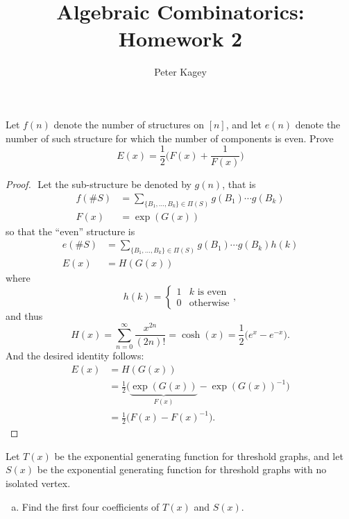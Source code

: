 \documentclass{article}
\newenvironment{problem}[2][Problem]{\begin{trivlist}
\item[\hskip \labelsep {\bfseries #1}\hskip \labelsep {\bfseries #2.}]}{\end{trivlist}}
\newcommand{\set}[1]{\{ #1 \}}
\newcommand{\paren}[1]{\biggl( #1 \biggr)}
\begin{document}
\title{Algebraic Combinatorics: Homework 2}
\author{Peter Kagey}

\maketitle

\begin{problem}{1}
  Let $f(n)$ denote the number of structures on $[n]$, and let $e(n)$ denote the
  number of such structure for which the number of components is even. Prove \[
    E(x) = \frac 12 \paren{F(x) + \frac 1{F(x)}}
  \]
\end{problem}

\begin{proof} $ $
  Let the sub-structure be denoted by $g(n)$, that is \begin{align*}
    f(\#S) &= \sum_{\set{B_1,\hdots,B_k} \in \Pi(S)} g(B_1)\cdots g(B_k) \\
    F(x) &= \exp(G(x))
  \end{align*} so that the ``even'' structure is \begin{align*}
    e(\#S) &= \sum_{\set{B_1,\hdots,B_k} \in \Pi(S)} g(B_1)\cdots g(B_k)h(k) \\
    E(x) &= H(G(x))
  \end{align*} where \[
    h(k) = \begin{cases}
      1 & k \text{ is even} \\
      0 & \text{otherwise}
    \end{cases},
  \]
  and thus \[
    H(x) = \sum_{n=0}^\infty \frac{x^{2n}}{(2n)!}
    = \cosh(x)
    = \frac 12 \paren{e^x - e^{-x}}.
  \]
  And the desired identity follows: \begin{align*}
    E(x)
    &= H(G(x)) \\
    &= \frac 12 \paren{\underbrace{\exp(G(x))}_{F(x)} - \exp(G(x))^{-1}} \\
    &= \frac 12 \paren{F(x) - F(x)^{-1}}.
  \end{align*}
\end{proof}
\pagebreak
\begin{problem}{2}
  Let $T(x)$ be the exponential generating function for threshold graphs, and
  let $S(x)$ be the exponential generating function for threshold graphs with
  no isolated vertex.
  \begin{enumerate}[(a)]
    \item Find the first four coefficients of $T(x)$ and $S(x)$.
  \end{enumerate}
\end{problem}
\end{document}
